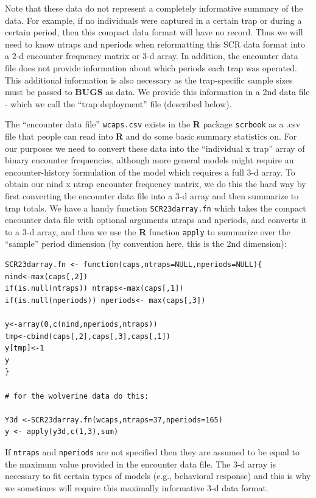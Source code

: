Note that these data do not represent a completely informative summary
of the data. For example, if no individuals were captured in a certain
trap or during a certain period, then this compact data format will
have no record. Thus we will need to know ntraps and nperiods when
reformatting this SCR data format into a 2-d encounter frequency
matrix or 3-d array. In addition, the encounter data file does not
provide information about which periods each trap was operated. This
additional information is also necessary as the trap-specific sample
sizes must be passed to {\bf BUGS} as data. We provide this information in a
2nd data file - which we call the ``trap deployment'' file (described
below).

The ``encounter data file'' \mbox{\tt wcaps.csv} exists in the {\bf R}
package \mbox{\tt scrbook} as a .csv file that people can read into
{\bf R} and do some basic summary statistics on. For our purposes we
need to convert these data into the ``individual x trap'' array of
binary encounter frequencies, although more general models might
require an encounter-history formulation of the model which requires a
full 3-d array.  To obtain our nind x ntrap encounter frequency
matrix, we do this the hard way by first converting the encounter data
file into a 3-d array and then summarize to trap totals. We have a
handy function \mbox{\tt SCR23darray.fn} which takes the compact
encounter data file with optional arguments ntraps and nperiods, and
converts it to a 3-d array, and then we use the {\bf R} function
\mbox{\tt apply} to summarize over the ``sample'' period dimension (by
convention here, this is the 2nd dimension):

\begin{verbatim}
SCR23darray.fn <- function(caps,ntraps=NULL,nperiods=NULL){
nind<-max(caps[,2])
if(is.null(ntraps)) ntraps<-max(caps[,1])
if(is.null(nperiods)) nperiods<- max(caps[,3])

y<-array(0,c(nind,nperiods,ntraps))
tmp<-cbind(caps[,2],caps[,3],caps[,1])
y[tmp]<-1
y
}

# for the wolverine data do this:

Y3d <-SCR23darray.fn(wcaps,ntraps=37,nperiods=165)
y <- apply(y3d,c(1,3),sum)
\end{verbatim}

If \mbox{\tt ntraps} and \mbox{\tt nperiods} are not specified then
they are assumed to be equal to the maximum value provided in the
encounter data file.  The 3-d array is necessary to fit certain types
of models (e.g., behavioral response) and this is why we sometimes
will require this maximally informative 3-d data format.


